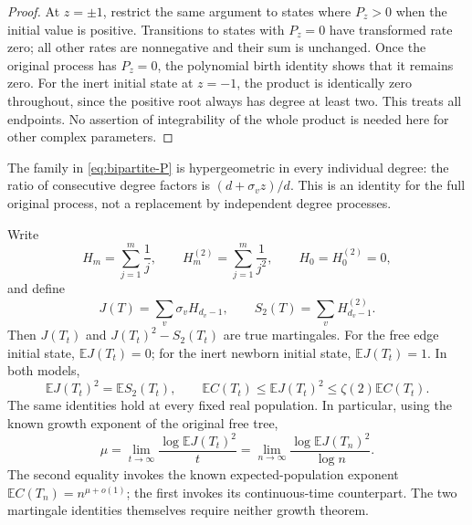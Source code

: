 \begin{proof}
At $z=\pm1$, restrict the same argument to states where $P_z>0$ when
the initial value is positive.  Transitions to states with $P_z=0$ have
transformed rate zero; all other rates are nonnegative and their sum
is unchanged.  Once the original process has $P_z=0$, the polynomial
birth identity shows that it remains zero.  For the inert initial
state at $z=-1$, the product is identically zero throughout, since the
positive root always has degree at least two.  This treats all endpoints.
No assertion of integrability of the whole product is needed here for
other complex parameters.
\end{proof}

The family in \eqref{eq:bipartite-P} is hypergeometric in every individual
degree: the ratio of consecutive degree factors is
$(d+\sigma_vz)/d$.  This is an identity for the full original process,
not a replacement by independent degree processes.

\begin{proposition}
\label{prop:bipartite-variance}
Write
\[
 H_m=\sum_{j=1}^m\frac1j,\qquad
 H_m^{(2)}=\sum_{j=1}^m\frac1{j^2},\qquad H_0=H_0^{(2)}=0,
\]
and define
\begin{equation}
 J(T)=\sum_v\sigma_vH_{d_v-1},\qquad
 S_2(T)=\sum_vH_{d_v-1}^{(2)}.
 \label{eq:bipartite-J-S2}
\end{equation}
Then $J(T_t)$ and $J(T_t)^2-S_2(T_t)$ are true martingales.
For the free edge initial state, $\mathbb EJ(T_t)=0$; for the inert
newborn initial state, $\mathbb EJ(T_t)=1$.  In both models,
\begin{equation}
 \mathbb EJ(T_t)^2=\mathbb ES_2(T_t),\qquad
 \mathbb EC(T_t)\le\mathbb EJ(T_t)^2
       \le\zeta(2)\mathbb EC(T_t).
 \label{eq:bipartite-variance-comparison}
\end{equation}
The same identities hold at every fixed real population.
In particular, using the known growth exponent of the original free
tree,
\begin{equation}
 \boxed{\mu=\lim_{t\to\infty}\frac{\log\mathbb EJ(T_t)^2}{t}
       =\lim_{n\to\infty}
          \frac{\log\mathbb EJ(T_n)^2}{\log n}.}
 \label{eq:bipartite-mu-variance}
\end{equation}
The second equality invokes the known expected-population exponent
$\mathbb EC(T_n)=n^{\mu+o(1)}$; the first invokes its continuous-time
counterpart.  The two martingale identities themselves require neither
growth theorem.
\end{proposition}

